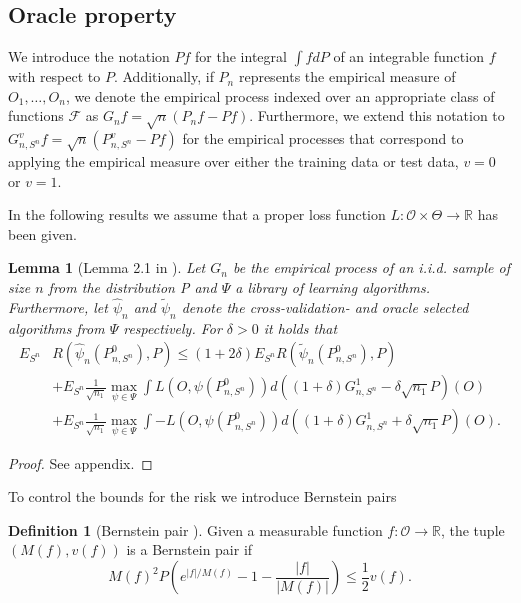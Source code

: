 \documentclass[11pt, a4paper]{article}
\newtheorem{lemma}[theorem]{Lemma}
\theoremstyle{definition}
\newtheorem{definition}[theorem]{Definition}
\theoremstyle{remark}
\newcommand{\la}{\psi}
\newcommand{\Sn}{S^n}
\newcommand{\lib}{\Psi}
\begin{document}
\subsection{Oracle property}
We introduce the notation $Pf$ for the integral $\int f dP$ of an integrable function $f$ with respect to $P$. Additionally, if $P_n$ represents the empirical measure of $O_1, \dots, O_n$, we denote the empirical process indexed over an appropriate class of functions $\mathcal{F}$ as $G_n f = \sqrt{n}(P_n f - P f)$. Furthermore, we extend this notation to $G_{n, \Sn}^{v} f = \sqrt{n}(P_{n, \Sn}^{v} - Pf)$ for the empirical processes that correspond to applying the empirical measure over either the training data or test data, $ v = 0 $ or $ v = 1 $.

In the following results we assume that a proper loss function $ L: \mathcal{O} \times \Theta \to \mathbb{R} $ has been given.  
\begin{lemma}[Lemma 2.1 in \parencite{vaart06}] \label{finitesampledecomp}
    Let $ G_{n} $ be the empirical process of an i.i.d. sample of size $ n $ from the distribution P and $ \lib$ a library of learning algorithms. Furthermore, let $ \hat{\la}_n  $ and $ \tilde{\la}_n $ denote the cross-validation- and oracle selected algorithms from $ \lib $ respectively. For $ \delta > 0 $ it holds that
   \begin{align*}
       E_{\Sn} &R( \hat{\la}_n(P_{n, \Sn}^{0}), P) \leq (1 + 2 \delta) E_{\Sn} R( \tilde{\la}_n(P_{n, \Sn}^{0}) , P ) \\ 
                                                                &+E_{\Sn} \frac{1}{\sqrt{n_1} } \max_{\la \in \lib} \int L(O, \la(P_{n, \Sn}^{0})) d ((1 + \delta) G_{n,\Sn}^{1} - \delta \sqrt{n_1} P)(O)  \\
                                                                &+E_{\Sn} \frac{1}{\sqrt{n_1} } \max_{\la \in \lib} \int-L(O, \la(P_{n, \Sn}^{0})) d ((1 + \delta) G_{n,\Sn}^{1} + \delta \sqrt{n_1} P)(O).
   \end{align*}
\end{lemma}
\begin{proof}
    See appendix.
\end{proof}
\noindent To control the bounds for the risk we introduce Bernstein pairs 
\begin{definition}[Bernstein pair \parencite{vaart06}]
    Given a measurable function $ f: \mathcal{O} \to \mathbb{R} $, the tuple $ (M(f) , v(f)) $ is a Bernstein pair if 
    \begin{equation} \label{bernstein}
        M(f)^2 P\left( e^{|f|/M(f)} -1 - \frac{|f|}{|M(f)|}\right) \leq \frac{1}{2}v(f). 
    \end{equation}
\end{definition}
\end{document}
